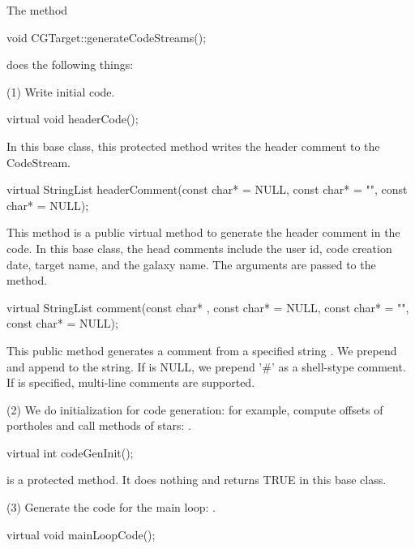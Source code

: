 The method 
   
\begin{example}
void CGTarget::generateCodeStreams();
\end{example}
   
does the following things:

(1) Write initial code.

\begin{example}
virtual void headerCode();
\end{example}

In this base class, this protected method writes the  header comment
to the  CodeStream.

\begin{example}
virtual StringList headerComment(const char*  = NULL, const char*
 = "", const char*  = NULL);
\end{example}

This method is a public virtual method to generate the header
comment in the code. In this base class, the head comments include the
user id, code creation date, target name, and the galaxy name. The
arguments are passed to the  method.

\begin{example}
virtual StringList comment(const char* , const char*  = 
NULL, const char*  = "", const char*  = NULL);
\end{example}

This public method generates a comment from a specified string .
We prepend  and append  to the string. If 
is NULL, we prepend '#' as a shell-stype comment. If  is 
specified, multi-line comments are supported.

(2) We do initialization for code generation: for example, compute
offsets of portholes and call  methods of stars:
.

\begin{example}
virtual int codeGenInit();
\end{example}

is a protected method. It does nothing and returns TRUE in this
base class.

(3) Generate the code for the main loop: .

\begin{example}
virtual void mainLoopCode();
\end{example}

